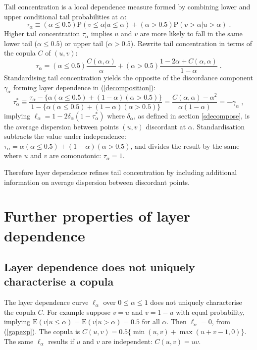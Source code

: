 \documentclass[authoryear]{elsarticle}
\newcommand{\E}{{\mathrm E}}
\newcommand{\p}{\mathrm{P}}
\newcommand{\eref}[1]{(\ref{#1})}
\newcommand{\aref}[1]{\ref{#1}}
\begin{document}
Tail concentration \citep{venter2002tails} is a local dependence measure formed by combining lower and upper conditional tail probabilities at $\alpha$:
$$
\tau_\alpha \equiv (\alpha\leq 0.5) \p(v\leq \alpha|u\leq \alpha) + (\alpha>0.5)\p(v>\alpha|u>\alpha) \;.
$$
Higher tail concentration $\tau_\alpha$ implies $u$ and $v$ are more likely to fall in the same lower tail ($\alpha\leq 0.5$) or upper tail ($\alpha>0.5$). Rewrite tail concentration in terms of the copula $C$ of $(u,v)$:
$$
\tau_\alpha = (\alpha\leq 0.5)\frac{C(\alpha,\alpha)}{\alpha}+(\alpha>0.5)\frac{1-2\alpha+C(\alpha,\alpha)}{1-\alpha} \;.
$$
Standardising tail concentration yields the opposite of the discordance component $\gamma_\alpha$ forming layer dependence in \eref{decomposition}:
$$
\tau_\alpha^* \equiv \frac{\tau_\alpha - \{\alpha(\alpha\leq 0.5)+(1-\alpha)(\alpha>0.5)\}}{1-\{\alpha(\alpha\leq 0.5)+(1-\alpha)(\alpha>0.5)\}}
=\frac{C(\alpha,\alpha)-\alpha^2}{\alpha(1-\alpha)} = -\gamma_\alpha \;,
$$
implying $\ell_\alpha=1-2\delta_\alpha(1-\tau_\alpha^*)$ where $\delta_\alpha$, as defined in section \aref{sdecompose}, is the average dispersion between points $(u,v)$ discordant at $\alpha$. Standardisation subtracts the value under independence: $\tau_\alpha=\alpha(\alpha\leq 0.5)+(1-\alpha)(\alpha>0.5)$, and divides the result by the same where $u$ and $v$ are comonotonic: $\tau_\alpha=1$.

Therefore layer dependence refines tail concentration by including additional information on  average dispersion between discordant points.

\section{Further properties of layer dependence}\label{sproperties}

\subsection{Layer dependence does not uniquely characterise a copula}

The layer dependence curve $\ell_\alpha$ over $0\le\alpha\le 1$ does not uniquely characterise the copula $C$.  For example suppose $v=u$ and $v=1-u$ with equal probability, implying $\E(v|u\leq \alpha)=\E(v|u>\alpha)=0.5$ for all $\alpha$. Then $\ell_\alpha=0$, from \eref{gapexp}. The copula is $C(u,v)=0.5\{\min(u,v)+\max(u+v-1,0)\}$.    The same $\ell_\alpha$ results if $u$ and $v$ are independent: $C(u,v)=uv$.
\end{document}
